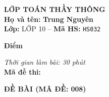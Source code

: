 \noindent
\begin{tcolorbox}[colback=white,colframe=black,arc=0mm,boxrule=0.8pt,top=4pt,bottom=4pt,left=6pt,right=6pt]
	\begin{minipage}[c]{0.44\textwidth}
		{\bfseries\large LỚP TOÁN THẦY THÔNG}\\[3pt]
		\textbf{Họ và tên:} \textbf{\large Trung Nguyên}\\[3pt]
		\textbf{Lớp:} LỚP 10 \quad -- \quad \textbf{Mã HS:} \texttt{HS032}
	\end{minipage}
	\hfill
	\begin{minipage}[c]{0.22\textwidth}
		\begin{tcolorbox}[colback=white,colframe=black,arc=0mm,boxrule=0.6pt,height=1.8cm,halign=center,valign=top,top=2pt]
			{\bfseries\normalsize Điểm}
		\end{tcolorbox}
	\end{minipage}
	\hfill
	\begin{minipage}[c]{0.30\textwidth}
		\raggedleft
		\textit{Thời gian làm bài: 30 phút}\\[4pt]
		\textbf{Mã đề thi:} 
	\end{minipage}
\end{tcolorbox}
\vspace{0.25cm}

\noindent\textbf{\large ĐỀ BÀI (MÃ ĐỀ: 008)}
\vspace{0.1cm}

